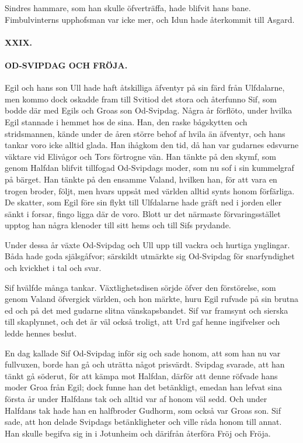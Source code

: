 Sindres hammare, som han skulle öfverträffa, hade blifvit hans bane.
Fimbulvinterns upphofsman var icke mer, och Idun hade återkommit till
Asgard.

\paragraph{XXIX.}

\paragraph{OD-SVIPDAG OCH FRÖJA.}

Egil och hans son Ull hade haft åtskilliga äfventyr på sin färd från
Ulfdalarne, men kommo dock oskadde fram till Svitiod det stora och
återfunno Sif, som bodde där med Egils och Groas son Od-Svipdag. Några
år förflöto, under hvilka Egil stannade i hemmet hos de sina. Han, den
raske bågskytten och stridsmannen, kände under de åren större behof af
hvila än äfventyr, och hans tankar voro icke alltid glada. Han ihågkom
den tid, då han var gudarnes edsvurne väktare vid Elivågor och Tors
förtrogne vän. Han tänkte på den skymf, som genom Halfdan blifvit
tillfogad Od-Svipdags moder, som nu sof i sin kummelgraf på bärget. Han
tänkte på den ensamme Valand, hvilken han, för att vara en trogen
broder, följt, men hvars uppsåt med världen alltid synts honom
förfärliga. De skatter, som Egil före sin flykt till Ulfdalarne hade
gräft ned i jorden eller sänkt i forsar, fingo ligga där de voro. Blott
ur det närmaste förvaringsstället upptog han några klenoder till sitt
hems och till Sifs prydande.

Under dessa år växte Od-Svipdag och Ull upp till vackra och hurtiga
ynglingar. Båda hade goda själsgåfvor; särskildt utmärkte sig Od-Svipdag
för snarfyndighet och kvickhet i tal och svar.

Sif hvälfde många tankar. Växtlighetsdisen sörjde öfver den förstörelse,
som genom Valand öfvergick världen, och hon märkte, huru Egil rufvade på
sin brutna ed och på det
\protect\hypertarget{lb1625905.xhtmlux5cux23start105}{}{}\protect\hypertarget{lb1625905.xhtmlux5cux23start105-a}{}{}\protect\hypertarget{lb1625905.xhtmlux5cux23start105-b}{}{}\protect\hypertarget{lb1625905.xhtmlux5cux23start105-c}{}{}\protect\hypertarget{lb1625905.xhtmlux5cux23start105-d}{}{}
med gudarne slitna vänskapsbandet. Sif var framsynt och sierska till
skaplynnet, och det är väl också troligt, att Urd gaf henne ingifvelser
och ledde hennes beslut.

En dag kallade Sif Od-Svipdag inför sig och sade honom, att som han nu
var fullvuxen, borde han gå och uträtta något prisvärdt. Svipdag
svarade, att han tänkt gå söderut, för att kämpa mot Halfdan, därför att
denne röfvade hans moder Groa från Egil; dock funne han det betänkligt,
emedan han lefvat sina första år under Halfdans tak och alltid var af
honom väl sedd. Och under Halfdans tak hade han en halfbroder Gudhorm,
som också var Groas son. Sif sade, att hon delade Svipdags
betänkligheter och ville råda honom till annat. Han skulle begifva sig
in i Jotunheim och därifrån återföra Fröj och Fröja.

